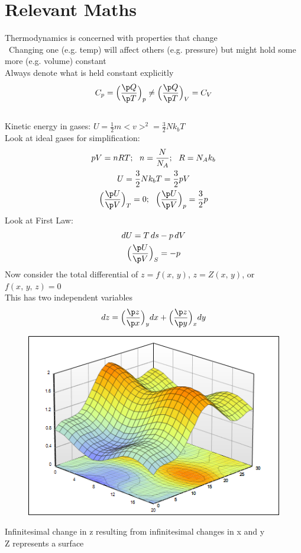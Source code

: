 \documentclass[a4paper, 11pt, normalem]{report}
\begin{document}
\section{Relevant Maths}
Thermodynamics is concerned with properties that change \\\
Changing one (e.g. temp) will affect others (e.g. pressure) but might hold some more (e.g. volume) constant \\
Always denote what is held constant explicitly
\begin{equation*}
    C_p = \Big(\frac{\p Q}{\p T}\Big)_p \neq \Big(\frac{\p Q}{\p T}\Big)_V = C_V
\end{equation*}

\subsection{}
Kinetic energy in gases: $U = \frac{1}{2}m<v>^2 = \frac{3}{2}Nk_{b}T$ \\
Look at ideal gases for simplification:
\begin{gather*}
    pV = nRT;~~ n = \frac{N}{N_{A}};~~ R = N_{A}k_{b} \\
    U = \frac{3}{2}Nk_{b}T = \frac{3}{2}pV \\
    \Big(\frac{\p U}{\p V}\Big)_T = 0;~~ \Big(\frac{\p U}{\p V}\Big)_p = \frac{3}{2}p
\end{gather*}
Look at First Law:
\begin{gather*}
    dU = T\,ds - p\,dV \\
    \Big(\frac{\p U}{\p V}\Big)_S = -p
\end{gather*}
Now consider the total differential of $z = f(x,\,y)$, $z = Z(x,\,y)$, or $f(x,\,y,\,z) = 0$ \\
This has two independent variables
\begin{equation*}
    dz = \Big(\frac{\p z}{\p x}\Big)_y dx + \Big(\frac{\p z}{\p y}\Big)_x dy
\end{equation*}
\newpage
\begin{figure}
    \begin{center}
        \includegraphics[scale=0.35]{Surface.png}
    \end{center}
\end{figure}
Infinitesimal change in z resulting from infinitesimal changes in x and y \\
Z represents a surface
\end{document}
